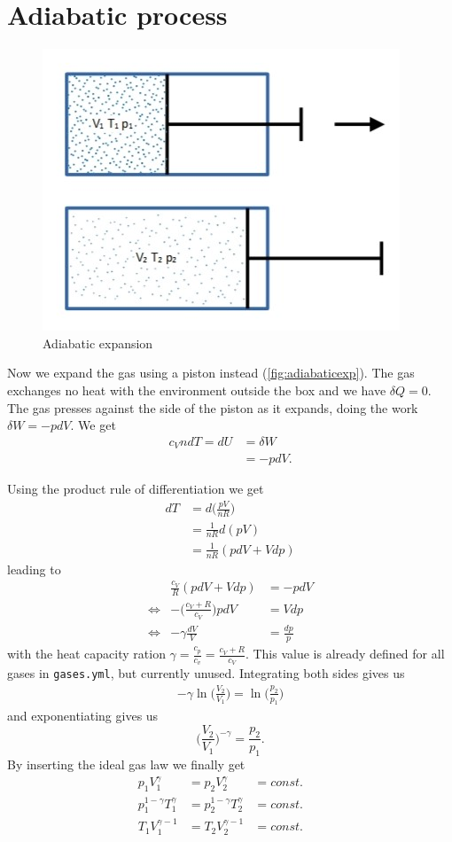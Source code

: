 \documentclass[12pt,a4paper]{article}
\numberwithin{equation}{section}
\begin{document}
\section{Adiabatic process}
\begin{figure}[h]
\centering
\includegraphics[scale=0.8]{image2}
\caption{Adiabatic expansion}\label{fig:adiabaticexp}
\end{figure}

Now we expand the gas using a piston instead (\autoref{fig:adiabaticexp}). The gas exchanges no heat with the environment outside the box and we have $\delta Q=0$. The gas presses against the side of the piston as it expands, doing the work $\delta W = -pdV$. We get
\begin{align}
c_VndT=dU&=\delta W\\
&= -pdV.
\end{align}

Using the product rule of differentiation we get
\begin{align}
dT&=d\Big(\frac{pV}{nR}\Big)\\
&=\frac{1}{nR} d(pV)\\
&=\frac{1}{nR} (pdV+Vdp)
\end{align}
leading to
\begin{align}
&&\frac{c_V}{R}(pdV+Vdp)&=-pdV&\\
&\iff&-\Big(\frac{c_V+R}{c_V}\Big) pdV&=Vdp&\\
&\iff&-\gamma \frac{dV}{V}&=\frac{dp}{p}&
\end{align}
with the heat capacity ration $\gamma = \frac{c_p}{c_v}=\frac{c_V+R}{c_V}$. This value is already defined for all gases in \texttt{gases.yml}, but currently unused. Integrating both sides gives us
\begin{align}
-\gamma \ln \Big( \frac{V_2}{V_1} \Big) =\ln \Big( \frac{p_2}{p_1} \Big)
\end{align}
and exponentiating  gives us
\begin{equation}
\Big( \frac{V_2}{V_1} \Big)^{-\gamma} = \frac{p_2}{p_1}.
\end{equation}
By inserting the ideal gas law we finally get
\begin{align}
p_1V_1^\gamma&=p_2V_2^\gamma&=const.&&\\
p_1^{1-\gamma}T_1^\gamma&=p_2^{1-\gamma}T_2^\gamma&=const.&&\\
T_1V_1^{\gamma-1}&=T_2V_2^{\gamma-1}&=const.&&
\end{align}
\end{document}
